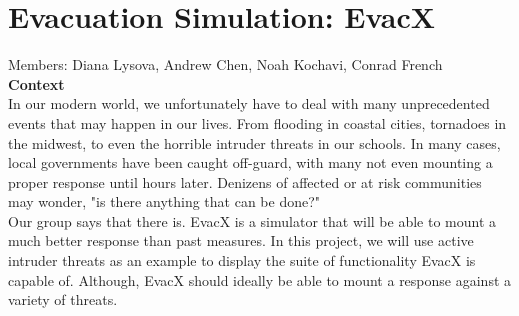 \documentclass[12pt]{article}
\begin{document}
\section*{\huge Evacuation Simulation: EvacX}
Members: Diana Lysova, Andrew Chen, Noah Kochavi, Conrad French \\ [5pt]
\textbf{Context} \\[5pt]
\hspace*{6mm} In our modern world, we unfortunately have to deal with many unprecedented events that may happen in our lives. From flooding in coastal cities, tornadoes in the midwest, to even the horrible intruder threats in our schools. In many cases, local governments have been caught off-guard, with many not even mounting a proper response until hours later. Denizens of affected or at risk communities may wonder, "is there anything that can be done?" \\[5pt]
\hspace*{6mm} Our group says that there is. EvacX is a simulator that will be able to mount a much better response than past measures. In this project, we will use active intruder threats as an example to display the suite of functionality EvacX is capable of. Although, EvacX should ideally be able to mount a response against a variety of threats.
\end{document}
